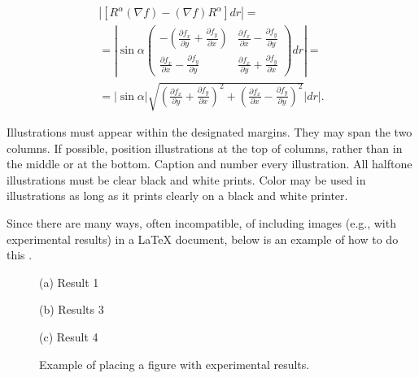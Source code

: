 \documentclass{article}
\begin{document}
\begin{multline*} 
  \left| \left[R^\alpha (\nabla f) - (\nabla f) R^\alpha \right] dr \right| = \\
  = \left| \sin \alpha \begin{pmatrix}
    -(\frac{\partial f_x}{\partial y} + \frac{\partial f_y}{\partial x}) &
    \frac{\partial f_x}{\partial x} - \frac{\partial f_y}{\partial y} \\
    \frac{\partial f_x}{\partial x} - \frac{\partial f_y}{\partial y} &
    \frac{\partial f_x}{\partial y} + \frac{\partial f_y}{\partial x} 
  \end{pmatrix} dr \right| = \\
  = |\sin \alpha| \sqrt{\left(\frac{\partial f_x}{\partial y} + \frac{\partial f_y}{\partial x}\right)^2 + \left(\frac{\partial f_x}{\partial x} - \frac{\partial f_y}{\partial y}\right)^2} \left| dr \right|.
\end{multline*}

Illustrations must appear within the designated margins.  They may span the two
columns.  If possible, position illustrations at the top of columns, rather
than in the middle or at the bottom.  Caption and number every illustration.
All halftone illustrations must be clear black and white prints.  Color may
be used in illustrations as long as it prints clearly on a black and white printer.

Since there are many ways, often incompatible, of including images (e.g., with
experimental results) in a LaTeX document, below is an example of how to do
this \cite{Lamp86}.

\begin{figure}[htb]

\begin{minipage}[b]{1.0\linewidth}
  \centering
  \vspace{2.0cm}
  \centerline{(a) Result 1}\medskip
\end{minipage}
%
\begin{minipage}[b]{.48\linewidth}
  \centering
  \vspace{1.5cm}
  \centerline{(b) Results 3}\medskip
\end{minipage}
\hfill
\begin{minipage}[b]{0.48\linewidth}
  \centering
  \vspace{1.5cm}
  \centerline{(c) Result 4}\medskip
\end{minipage}
%
\caption{Example of placing a figure with experimental results.}
\label{fig:res}
%
\end{figure}
\end{document}
